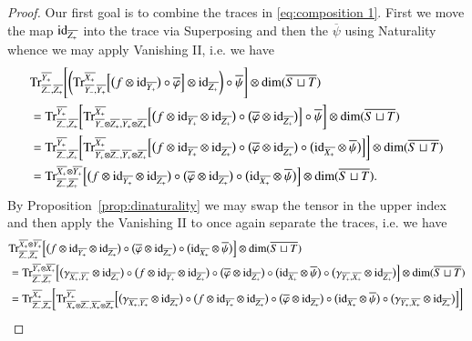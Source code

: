 \documentclass{amsart}
\def\tn{\textnormal}
\def\dim{\tn{dim}}
\def\Trace{\tn{Tr}}
\def\ol{\overline}
\def\id{\tn{id}}
\theoremstyle{remark}
\theoremstyle{definition}
\begin{document}
\begin{proof}
Our first goal is to combine the traces in \eqref{eq:composition 1}.  First we move the map $\id_{\ol{Z_+}}$ into the trace via Superposing and then the $\ol{\psi}$ using Naturality whence we may apply Vanishing II, i.e. we have
\begin{align*}
 &\Trace^{\ol{Y_+}}_{\ol{Z_-},\ol{Z_+}}
\Bigg[\bigg(
\Trace^{\ol{X_+}}_{\ol{Y_-},\ol{Y_+}}\Big[\big(f\otimes\id_{\ol{Y_+}}\big)\circ\ol{\varphi}\Big]\otimes\id_{\ol{Z_+}}\bigg)\circ\ol{\psi}
\Bigg]
\otimes\dim(\ol{S\sqcup T})\\
%
&=\Trace^{\ol{Y_+}}_{\ol{Z_-},\ol{Z_+}}
\bigg[
\Trace^{\ol{X_+}}_{\ol{Y_-}\otimes\ol{Z_+},\ol{Y_+}\otimes\ol{Z_+}}\Big[\big(f\otimes\id_{\ol{Y_+}}\otimes\id_{\ol{Z_+}}\big)\circ\big(\ol{\varphi}\otimes\id_{\ol{Z_+}}\big)\Big]\circ\ol{\psi}
\bigg]
\otimes\dim(\ol{S\sqcup T})\\
%
&=\Trace^{\ol{Y_+}}_{\ol{Z_-},\ol{Z_+}}
\bigg[
\Trace^{\ol{X_+}}_{\ol{Y_+}\otimes\ol{Z_-},\ol{Y_+}\otimes\ol{Z_+}}\Big[\big(f\otimes\id_{\ol{Y_+}}\otimes\id_{\ol{Z_+}}\big)\circ\big(\ol{\varphi}\otimes\id_{\ol{Z_+}}\big)\circ\big(\id_{\ol{X_+}}\otimes\ol{\psi}\big)\Big]
\bigg]
\otimes\dim(\ol{S\sqcup T})\\
%
&=\Trace^{\ol{X_+}\otimes\ol{Y_+}}_{\ol{Z_-},\ol{Z_+}}
\Big[\big(f\otimes\id_{\ol{Y_+}}\otimes\id_{\ol{Z_+}}\big)\circ\big(\ol{\varphi}\otimes\id_{\ol{Z_+}}\big)\circ\big(\id_{\ol{X_+}}\otimes\ol{\psi}\big)\Big]
\otimes\dim(\ol{S\sqcup T}).
\end{align*}
By Proposition~\ref{prop:dinaturality} we may swap the tensor in the upper index and then apply the Vanishing II to once again separate the traces, i.e. we have
\begin{align*}
&\Trace^{\ol{X_+}\otimes\ol{Y_+}}_{\ol{Z_-},\ol{Z_+}}
\Big[\big(f\otimes\id_{\ol{Y_+}}\otimes\id_{\ol{Z_+}}\big)\circ\big(\ol{\varphi}\otimes\id_{\ol{Z_+}}\big)\circ\big(\id_{\ol{X_+}}\otimes\ol{\psi}\big)\Big]
\otimes\dim(\ol{S\sqcup T})\\
%
&=\Trace^{\ol{Y_+}\otimes\ol{X_+}}_{\ol{Z_-},\ol{Z_+}}
\Big[\big(\gamma_{\ol{X_+},\ol{Y_+}}\otimes\id_{\ol{Z_+}}\big)\circ\big(f\otimes\id_{\ol{Y_+}}\otimes\id_{\ol{Z_+}}\big)\circ\big(\ol{\varphi}\otimes\id_{\ol{Z_+}}\big)\circ\big(\id_{\ol{X_+}}\otimes\ol{\psi}\big)\circ\big(\gamma_{\ol{Y_+},\ol{X_+}}\otimes\id_{\ol{Z_+}}\big)\Big]
\otimes\dim(\ol{S\sqcup T})\\
&=\Trace^{\ol{X_+}}_{\ol{Z_-},\ol{Z_+}}\bigg[
\Trace^{\ol{Y_+}}_{\ol{X_+}\otimes\ol{Z_-},\ol{X_+}\otimes\ol{Z_+}}\Big[
\big(\gamma_{\ol{X_+},\ol{Y_+}}\otimes\id_{\ol{Z_+}}\big)\circ\big(f\otimes\id_{\ol{Y_+}}\otimes\id_{\ol{Z_+}}\big)\circ\big(\ol{\varphi}\otimes\id_{\ol{Z_+}}\big)\circ\big(\id_{\ol{X_+}}\otimes\ol{\psi}\big)\circ\big(\gamma_{\ol{Y_+},\ol{X_+}}\otimes\id_{\ol{Z_+}}\big)\Big]\bigg]

\end{align*}
\end{proof}
\end{document}

